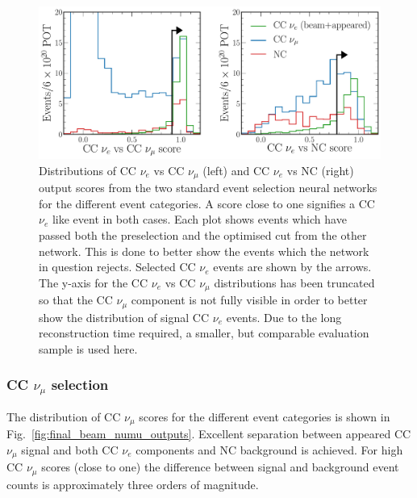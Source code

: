 \begin{figure} %
    \includegraphics[width=\textwidth]{diagrams/7-results/final_old_pid_outputs.pdf}
    \caption[Distributions of standard event selectio neural network output scores]
    {Distributions of CC $\nu_{e}$ vs CC $\nu_{\mu}$ (left) and CC $\nu_{e}$ vs NC (right) output
        scores from the two standard event selection neural networks for the different event
        categories. A score close to one signifies a CC $\nu_{e}$ like event in both cases. Each
        plot shows events which have passed both the preselection and the optimised cut from the
        other network. This is done to better show the events which the network in question
        rejects. Selected CC $\nu_{e}$ events are shown by the arrows. The y-axis for the CC
        $\nu_{e}$ vs CC $\nu_{\mu}$ distributions has been truncated so that the CC $\nu_{\mu}$
        component is not fully visible in order to better show the distribution of signal CC
        $\nu_{e}$ events. Due to the long reconstruction time required, a smaller, but comparable
        evaluation sample is used here.}
    \label{fig:final_old_pid_outputs}
\end{figure}

\subsubsection*{CC $\nu_{\mu}$ selection} %

The distribution of CC $\nu_{\mu}$ scores for the different event categories is shown in
Fig.~\ref{fig:final_beam_numu_outputs}. Excellent separation between appeared CC $\nu_{\mu}$
signal and both CC $\nu_{e}$ components and NC background is achieved. For high CC $\nu_{\mu}$
scores (close to one) the difference between signal and background event counts is approximately
three orders of magnitude.

